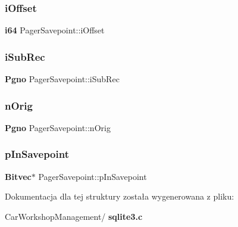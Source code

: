 \subsubsection{iOffset}
{\footnotesize\ttfamily \textbf{ i64} Pager\+Savepoint\+::i\+Offset}

\mbox{\label{struct_pager_savepoint_ac1accce313b9da31631892e2cbe85a2f}} 
\subsubsection{iSubRec}
{\footnotesize\ttfamily \textbf{ Pgno} Pager\+Savepoint\+::i\+Sub\+Rec}

\mbox{\label{struct_pager_savepoint_a944cca2844a51bdba253476f516b9865}} 
\subsubsection{nOrig}
{\footnotesize\ttfamily \textbf{ Pgno} Pager\+Savepoint\+::n\+Orig}

\mbox{\label{struct_pager_savepoint_abf7d6dc9d457c866727f84c4b9e0348f}} 
\subsubsection{pInSavepoint}
{\footnotesize\ttfamily \textbf{ Bitvec}$\ast$ Pager\+Savepoint\+::p\+In\+Savepoint}



Dokumentacja dla tej struktury została wygenerowana z pliku\+:\begin{DoxyCompactItemize}
\item 
Car\+Workshop\+Management/\textbf{ sqlite3.\+c}\end{DoxyCompactItemize}
